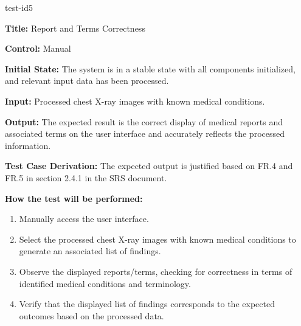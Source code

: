 \documentclass[12pt, titlepage]{article}
\begin{document}
\begin{itemize}
    \begin{item}
        test-id5
        \begin{mdframed}[linewidth=0.5mm]
            \textbf{Title:} Report and Terms Correctness \par
            \textbf{Control:} Manual \par
            \textbf{Initial State:} The system is in a stable state with all components initialized, and relevant input data has been processed. \par
            \textbf{Input:} Processed chest X-ray images with known medical conditions. \par
            \textbf{Output:} The expected result is the correct display of medical reports and associated terms on the user interface and accurately reflects the processed information. \par
            \textbf{Test Case Derivation:} The expected output is justified based on FR.4 and FR.5 in section 2.4.1 in the SRS document. \par
            \textbf{How the test will be performed:}
            \begin{enumerate} [noitemsep]
                \item Manually access the user interface.
                \item Select the processed chest X-ray images with known medical conditions to generate an associated list of findings.
                \item Observe the displayed reports/terms, checking for correctness in terms of identified medical conditions and terminology.
                \item Verify that the displayed list of findings corresponds to the expected outcomes based on the processed data.
            \end{enumerate}
        \end{mdframed} 
    \end{item}
\end{itemize}
\end{document}
